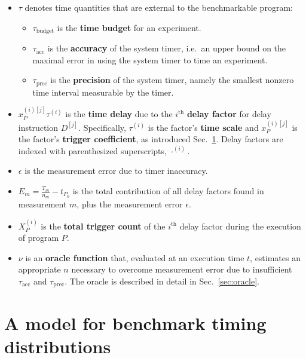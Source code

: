 \documentclass[conference]{IEEEtran}
\begin{document}
\begin{itemize}
    \item
    $\tau$ denotes time quantities that are external to the benchmarkable program:
    \begin{itemize}
        \item $\tau_{\textrm{budget}}$ is the \textbf{time budget} for an experiment.
        \item $\tau_{\textrm{acc}}$ is the \textbf{accuracy} of the system timer, i.e.\ an upper bound on the maximal error in using the system timer to time an experiment.
        \item $\tau_{\textrm{prec}}$ is the \textbf{precision} of the system timer, namely the smallest nonzero time interval measurable by the timer.
    \end{itemize}

    \item
    $x_P^{(i)[j]} \tau^{(i)}$ is the \textbf{time delay} due to the
    $i^{\textrm{th}}$ \textbf{delay factor} for delay instruction $D^{[j]}$.  Specifically,
    $\tau^{(i)}$ is the factor's \textbf{time scale} and $x_P^{(i)[j]}$ is the factor's
    \textbf{trigger coefficient}, as introduced Sec.~\ref{sec:model}. Delay factors are indexed with  parenthesized
    superscripts, $\cdot^{(i)}$.

    \item
    $\epsilon$ is the measurement error due to timer inaccuracy.

    \item
    $E_m = \frac{T_m}{n_m} - t_{P_0}$ is the total contribution of all delay
factors found in measurement $m$, plus the measurement error $\epsilon$.

    \item
    $X^{(i)}_P$ is the \textbf{total trigger count} of the $i^{\textrm{th}}$
    delay factor during the execution of program $P$.

    \item
    $\nu$ is an \textbf{oracle function} that, evaluated at an execution time
$t$, estimates an appropriate $n$ necessary to overcome measurement error due
to insufficient
    $\tau_{\textrm{acc}}$ and $\tau_{\textrm{prec}}$. The oracle is described in detail in Sec.~\ref{sec:oracle}.
\end{itemize}

\section{A model for benchmark timing distributions}
\label{sec:model}
\end{document}
